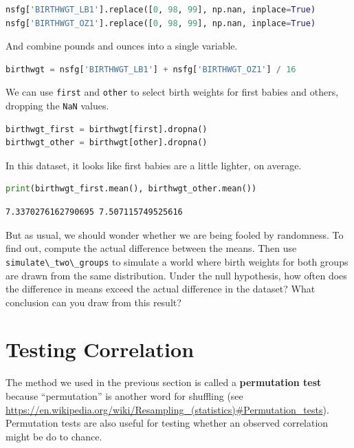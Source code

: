 \begin{lstlisting}[language=Python,style=source]
nsfg['BIRTHWGT_LB1'].replace([0, 98, 99], np.nan, inplace=True)
nsfg['BIRTHWGT_OZ1'].replace([0, 98, 99], np.nan, inplace=True)
\end{lstlisting}

And combine pounds and ounces into a single variable.

\begin{lstlisting}[language=Python,style=source]
birthwgt = nsfg['BIRTHWGT_LB1'] + nsfg['BIRTHWGT_OZ1'] / 16
\end{lstlisting}

We can use \passthrough{\lstinline!first!} and
\passthrough{\lstinline!other!} to select birth weights for first babies
and others, dropping the \passthrough{\lstinline!NaN!} values.

\begin{lstlisting}[language=Python,style=source]
birthwgt_first = birthwgt[first].dropna()
birthwgt_other = birthwgt[other].dropna()
\end{lstlisting}

In this dataset, it looks like first babies are a little lighter, on
average.

\begin{lstlisting}[language=Python,style=source]
print(birthwgt_first.mean(), birthwgt_other.mean())
\end{lstlisting}

\begin{lstlisting}[style=output]
7.3370276162790695 7.507115749525616
\end{lstlisting}

But as usual, we should wonder whether we are being fooled by
randomness. To find out, compute the actual difference between the
means. Then use \passthrough{\lstinline!simulate\_two\_groups!} to
simulate a world where birth weights for both groups are drawn from the
same distribution. Under the null hypothesis, how often does the
difference in means exceed the actual difference in the dataset? What
conclusion can you draw from this result?

\hypertarget{testing-correlation}{%
\section{Testing Correlation}\label{testing-correlation}}

The method we used in the previous section is called a
\textbf{permutation test} because ``permutation'' is another word for
shuffling (see
\url{https://en.wikipedia.org/wiki/Resampling_(statistics)\#Permutation_tests}).
Permutation tests are also useful for testing whether an observed
correlation might be do to chance.

